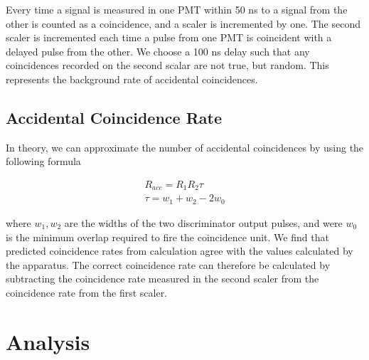 \documentclass{article}
\begin{document}
Every time a signal is measured in one PMT within 50 ns to a signal from the other is counted as a coincidence, and a scaler is incremented by one. The second scaler is incremented each time a pulse from one PMT is coincident with a delayed pulse from the other. We choose a 100 ns delay such that any coincidences recorded on the second scalar are not true, but random. This represents the background rate of accidental coincidences.

\hspace{.25cm}

\subsection{Accidental Coincidence Rate}

In theory, we can approximate the number of accidental coincidences by using the following formula

\begin{gather}
	R_{acc} = R_1 R_2 \tau \\
	\tau = w_1 + w_2 - 2w_0
\end{gather}

where $w_1, w_2$ are the widths of the two discriminator output pulses, and were $w_0$ is the minimum overlap required to fire the coincidence unit. We find that predicted coincidence rates from calculation agree with the values calculated by the apparatus. The correct coincidence rate can therefore be calculated by subtracting the coincidence rate measured in the second scaler from the coincidence rate from the first scaler.

\section{Analysis}
\end{document}
